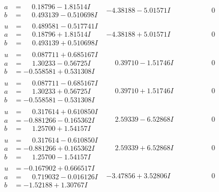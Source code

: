 \documentclass[1p]{elsarticle_modified}
\theoremstyle{definition}
\begin{document}
$$\begin{array}{c|c|c}
\begin{aligned}
a &= \phantom{-}0.18796 - 1.81514 I \\
b &= \phantom{-}0.493139 - 0.510698 I\end{aligned}
 & -4.38188 - 5.01571 I & \phantom{-0.000000 } 0 \\ \hline\begin{aligned}
u &= \phantom{-}0.489581 - 0.517741 I \\
a &= \phantom{-}0.18796 + 1.81514 I \\
b &= \phantom{-}0.493139 + 0.510698 I\end{aligned}
 & -4.38188 + 5.01571 I & \phantom{-0.000000 } 0 \\ \hline\begin{aligned}
u &= \phantom{-}0.087711 + 0.685167 I \\
a &= \phantom{-}1.30233 - 0.56725 I \\
b &= -0.558581 + 0.531308 I\end{aligned}
 & \phantom{-}0.39710 - 1.51746 I & \phantom{-0.000000 } 0 \\ \hline\begin{aligned}
u &= \phantom{-}0.087711 - 0.685167 I \\
a &= \phantom{-}1.30233 + 0.56725 I \\
b &= -0.558581 - 0.531308 I\end{aligned}
 & \phantom{-}0.39710 + 1.51746 I & \phantom{-0.000000 } 0 \\ \hline\begin{aligned}
u &= \phantom{-}0.317614 + 0.610850 I \\
a &= -0.881266 - 0.165362 I \\
b &= \phantom{-}1.25700 + 1.54157 I\end{aligned}
 & \phantom{-}2.59339 - 6.52868 I & \phantom{-0.000000 } 0 \\ \hline\begin{aligned}
u &= \phantom{-}0.317614 - 0.610850 I \\
a &= -0.881266 + 0.165362 I \\
b &= \phantom{-}1.25700 - 1.54157 I\end{aligned}
 & \phantom{-}2.59339 + 6.52868 I & \phantom{-0.000000 } 0 \\ \hline\begin{aligned}
u &= -0.167902 + 0.666517 I \\
a &= \phantom{-}0.719032 - 0.016126 I \\
b &= -1.52188 + 1.30767 I\end{aligned}
 & -3.47856 + 3.52806 I & \phantom{-0.000000 } 0 \\ \hline\begin{aligned}

\end{aligned}
\end{array}$$
\end{document}
